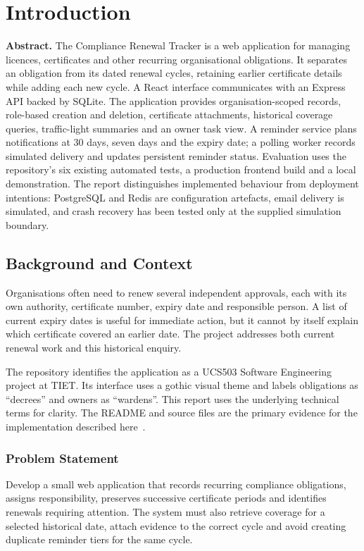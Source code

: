 \chapter{Introduction}
\noindent\textbf{Abstract.}
The Compliance Renewal Tracker is a web application for managing licences, certificates and other recurring organisational obligations. It separates an obligation from its dated renewal cycles, retaining earlier certificate details while adding each new cycle. A React interface communicates with an Express API backed by SQLite. The application provides organisation-scoped records, role-based creation and deletion, certificate attachments, historical coverage queries, traffic-light summaries and an owner task view. A reminder service plans notifications at 30 days, seven days and the expiry date; a polling worker records simulated delivery and updates persistent reminder status. Evaluation uses the repository's six existing automated tests, a production frontend build and a local demonstration. The report distinguishes implemented behaviour from deployment intentions: PostgreSQL and Redis are configuration artefacts, email delivery is simulated, and crash recovery has been tested only at the supplied simulation boundary.

\section{Background and Context}
Organisations often need to renew several independent approvals, each with its own authority, certificate number, expiry date and responsible person. A list of current expiry dates is useful for immediate action, but it cannot by itself explain which certificate covered an earlier date. The project addresses both current renewal work and this historical enquiry.

The repository identifies the application as a UCS503 Software Engineering project at TIET. Its interface uses a gothic visual theme and labels obligations as ``decrees'' and owners as ``wardens''. This report uses the underlying technical terms for clarity. The README and source files are the primary evidence for the implementation described here~\cite{project}.

\subsection{Problem Statement}
Develop a small web application that records recurring compliance obligations, assigns responsibility, preserves successive certificate periods and identifies renewals requiring attention. The system must also retrieve coverage for a selected historical date, attach evidence to the correct cycle and avoid creating duplicate reminder tiers for the same cycle.


